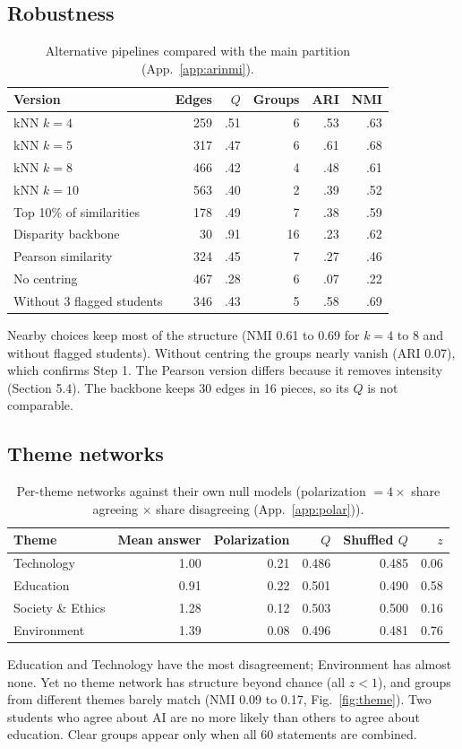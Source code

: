 \documentclass[10pt,a4paper]{article}
\newcommand{\app}[1]{(App.~\ref{app:#1})}\setlength{\columnsep}{14pt}
\begin{document}
\subsection{Robustness}\label{sec:rob}
\begin{table}[H]\centering\small
\begin{tabular}{lrrrrr}\toprule
Version & Edges & $Q$ & Groups & ARI & NMI\\\midrule
kNN $k=4$ & 259 & .51 & 6 & .53 & .63\\
kNN $k=5$ & 317 & .47 & 6 & .61 & .68\\
kNN $k=8$ & 466 & .42 & 4 & .48 & .61\\
kNN $k=10$ & 563 & .40 & 2 & .39 & .52\\
Top 10\% of similarities & 178 & .49 & 7 & .38 & .59\\
Disparity backbone & 30 & .91 & 16 & .23 & .62\\
Pearson similarity & 324 & .45 & 7 & .27 & .46\\
No centring & 467 & .28 & 6 & .07 & .22\\
Without 3 flagged students & 346 & .43 & 5 & .58 & .69\\\bottomrule
\end{tabular}\caption{Alternative pipelines compared with the main partition \app{arinmi}.}\end{table}
Nearby choices keep most of the structure (NMI 0.61 to 0.69 for $k=4$ to 8 and without flagged students). Without centring the groups nearly vanish (ARI 0.07), which confirms Step 1. The Pearson version differs because it removes intensity (Section 5.4). The backbone keeps 30 edges in 16 pieces, so its $Q$ is not comparable.

\subsection{Theme networks}
\begin{table}[H]\centering\small
\begin{tabular}{lrrrrr}\toprule
Theme & Mean answer & Polarization & $Q$ & Shuffled $Q$ & $z$\\\midrule
Technology & 1.00 & 0.21 & 0.486 & 0.485 & 0.06\\
Education & 0.91 & 0.22 & 0.501 & 0.490 & 0.58\\
Society \& Ethics & 1.28 & 0.12 & 0.503 & 0.500 & 0.16\\
Environment & 1.39 & 0.08 & 0.496 & 0.481 & 0.76\\\bottomrule
\end{tabular}\caption{Per-theme networks against their own null models (polarization $=4\times$ share agreeing $\times$ share disagreeing \app{polar}).}\end{table}
Education and Technology have the most disagreement; Environment has almost none. Yet no theme network has structure beyond chance (all $z<1$), and groups from different themes barely match (NMI 0.09 to 0.17, Fig.~\ref{fig:theme}). Two students who agree about AI are no more likely than others to agree about education. Clear groups appear only when all 60 statements are combined.
\end{document}
